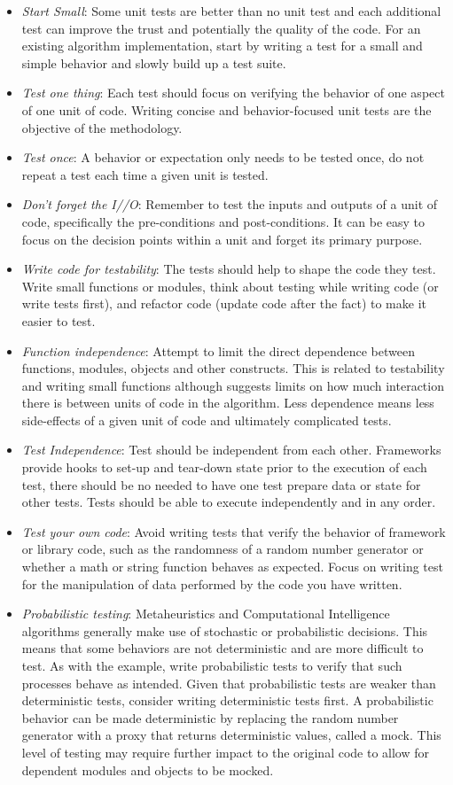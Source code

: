 \documentclass[a4paper, 11pt]{article}
\begin{document}
\begin{itemize}
 	\item \emph{Start Small}: Some unit tests are better than no unit test and each additional test can improve the trust and potentially the quality of the code. For an existing algorithm implementation, start by writing a test for a small and simple behavior and slowly build up a test suite.
  \item \emph{Test one thing}: Each test should focus on verifying the behavior of one aspect of one unit of code. Writing concise and behavior-focused unit tests are the objective of the methodology.
  \item \emph{Test once}: A behavior or expectation only needs to be tested once, do not repeat a test each time a given unit is tested.
  \item \emph{Don't forget the I//O}: Remember to test the inputs and outputs of a unit of code, specifically the pre-conditions and post-conditions. It can be easy to focus on the decision points within a unit and forget its primary purpose.
	\item \emph{Write code for testability}: The tests should help to shape the code they test. Write small functions or modules, think about testing while writing code (or write tests first), and refactor code (update code after the fact) to make it easier to test.
	\item \emph{Function independence}: Attempt to limit the direct dependence between functions, modules, objects and other constructs. This is related to testability and writing small functions although suggests limits on how much interaction there is between units of code in the algorithm. Less dependence means less side-effects of a given unit of code and ultimately complicated tests.
  \item \emph{Test Independence}: Test should be independent from each other. Frameworks provide hooks to set-up and tear-down state prior to the execution of each test, there should be no needed to have one test prepare data or state for other tests. Tests should be able to execute independently and in any order.
	\item \emph{Test your own code}: Avoid writing tests that verify the behavior of framework or library code, such as the randomness of a random number generator or whether a math or string function behaves as expected. Focus on writing test for the manipulation of data performed by the code you have written.
	\item \emph{Probabilistic testing}: Metaheuristics and Computational Intelligence algorithms generally make use of stochastic or probabilistic decisions. This means that some behaviors are not deterministic and are more difficult to test. As with the example, write probabilistic tests to verify that such processes behave as intended. Given that probabilistic tests are weaker than deterministic tests, consider writing deterministic tests first. A probabilistic behavior can be made deterministic by replacing the random number generator with a proxy that returns deterministic values, called a mock. This level of testing may require further impact to the original code to allow for dependent modules and objects to be mocked.

\end{itemize}
\end{document}
